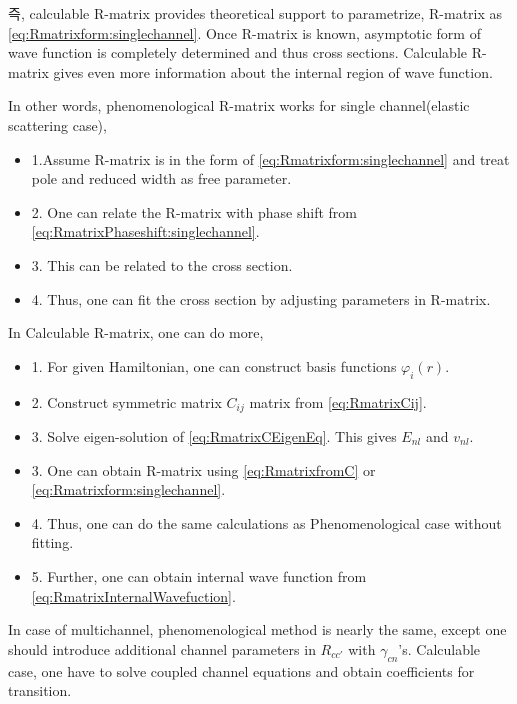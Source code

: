 \documentclass[11pt]{book}
\begin{document}
즉, calculable R-matrix provides theoretical support to parametrize, R-matrix as \eqref{eq:Rmatrixform:singlechannel}. Once R-matrix is known, 
asymptotic form of wave function is completely determined and thus cross sections. 
Calculable R-matrix gives even more information about the internal region of wave function. 

In other words, 
phenomenological R-matrix works for single channel(elastic scattering case),
\begin{itemize}
	\item 1.Assume R-matrix is in the form of \eqref{eq:Rmatrixform:singlechannel} and treat pole and
	     reduced width as free parameter. 
	\item 2. One can relate the R-matrix with phase shift from \eqref{eq:RmatrixPhaseshift:singlechannel}.
	\item 3. This can be related to the cross section. 
	\item 4. Thus, one can fit the cross section by adjusting parameters in R-matrix.       
\end{itemize}
In Calculable R-matrix, one can do more,
\begin{itemize}
	\item 1. For given Hamiltonian, one can construct basis functions $\varphi_i(r)$.
	\item 2. Construct symmetric matrix $C_{ij}$ matrix from \eqref{eq:RmatrixCij}.
	\item 3. Solve eigen-solution of \eqref{eq:RmatrixCEigenEq}. This gives $E_{nl}$ and $v_{nl}$.         
	\item 3. One can obtain R-matrix using \eqref{eq:RmatrixfromC} or  \eqref{eq:Rmatrixform:singlechannel}. 
	\item 4. Thus, one can do the same calculations as Phenomenological case without fitting. 
	\item 5. Further, one can obtain internal wave function from \eqref{eq:RmatrixInternalWavefuction}. 
\end{itemize}

In case of multichannel, phenomenological method is nearly the same, except one should introduce
additional channel parameters in $R_{cc'}$ with $\gamma_{c n}$'s. 
Calculable case, one have to solve coupled channel equations and obtain coefficients 
for transition. 
\end{document}
